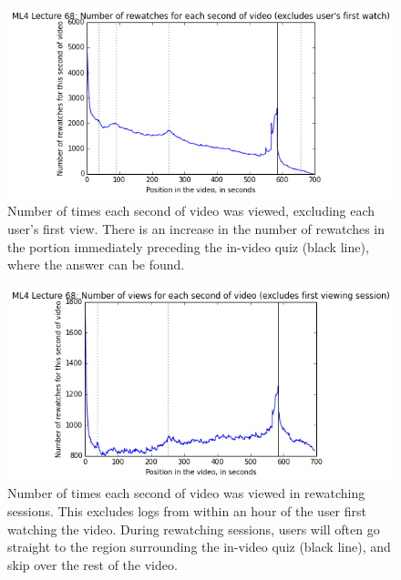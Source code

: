 \documentclass[letterpaper]{article}
\begin{document}
\begin{figure}
\includegraphics[width=1.0\columnwidth]{rewatches}
\caption{Number of times each second of video was viewed, excluding each user's first view. There is an increase in the number of rewatches in the portion immediately preceding the in-video quiz (black line), where the answer can be found.}
\label{fig:rewatches}
\end{figure}

\begin{figure}
\includegraphics[width=1.0\columnwidth]{rewatchingsessions}
\caption{Number of times each second of video was viewed in rewatching sessions. This excludes logs from within an hour of the user first watching the video. During rewatching sessions, users will often go straight to the region surrounding the in-video quiz (black line), and skip over the rest of the video.}
\label{fig:rewatchingsessions}
\end{figure}
\end{document}
